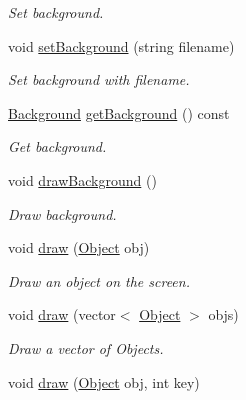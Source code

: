 \begin{DoxyCompactItemize}
\begin{DoxyCompactList}\small\item\em Set background. \end{DoxyCompactList}\item 
void \hyperlink{classEngine_a376e4a1ba9adc079e1da9b28a290abd2}{set\+Background} (string filename)\hypertarget{classEngine_a376e4a1ba9adc079e1da9b28a290abd2}{}\label{classEngine_a376e4a1ba9adc079e1da9b28a290abd2}

\begin{DoxyCompactList}\small\item\em Set background with filename. \end{DoxyCompactList}\item 
\hyperlink{classBackground}{Background} \hyperlink{classEngine_aa9398f6b48392dc520ab8c529e1d10c4}{get\+Background} () const \hypertarget{classEngine_aa9398f6b48392dc520ab8c529e1d10c4}{}\label{classEngine_aa9398f6b48392dc520ab8c529e1d10c4}

\begin{DoxyCompactList}\small\item\em Get background. \end{DoxyCompactList}\item 
void \hyperlink{classEngine_aa84c13e84d00fd3b0389a9a076ec194f}{draw\+Background} ()\hypertarget{classEngine_aa84c13e84d00fd3b0389a9a076ec194f}{}\label{classEngine_aa84c13e84d00fd3b0389a9a076ec194f}

\begin{DoxyCompactList}\small\item\em Draw background. \end{DoxyCompactList}\item 
void \hyperlink{classEngine_a276e63ae5648c36051c21c5b7c5dfb4b}{draw} (\hyperlink{classObject}{Object} obj)\hypertarget{classEngine_a276e63ae5648c36051c21c5b7c5dfb4b}{}\label{classEngine_a276e63ae5648c36051c21c5b7c5dfb4b}

\begin{DoxyCompactList}\small\item\em Draw an object on the screen. \end{DoxyCompactList}\item 
void \hyperlink{classEngine_a212b1b788cae7931fda927c0cbd2e165}{draw} (vector$<$ \hyperlink{classObject}{Object} $>$ objs)\hypertarget{classEngine_a212b1b788cae7931fda927c0cbd2e165}{}\label{classEngine_a212b1b788cae7931fda927c0cbd2e165}

\begin{DoxyCompactList}\small\item\em Draw a vector of Objects. \end{DoxyCompactList}\item 
void \hyperlink{classEngine_a81d89df09ee2577fd7deaf2f5e27f93a}{draw} (\hyperlink{classObject}{Object} obj, int key)\hypertarget{classEngine_a81d89df09ee2577fd7deaf2f5e27f93a}{}\label{classEngine_a81d89df09ee2577fd7deaf2f5e27f93a}


\end{DoxyCompactItemize}
